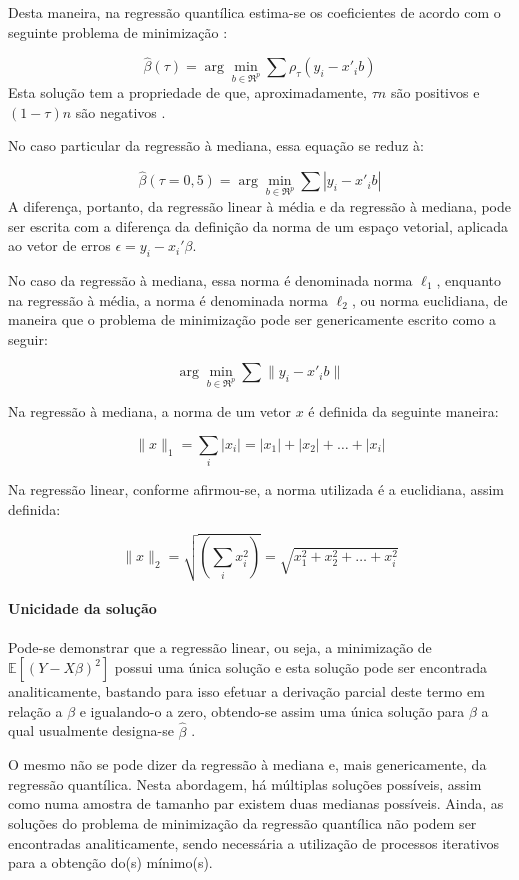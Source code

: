\documentclass[a4paper, 12pt]{article}
\let\oldparagraph\paragraph
\renewcommand{\paragraph}[1]{\oldparagraph{#1}\mbox{}}
\begin{document}
Desta maneira, na regressão quantílica estima-se os coeficientes de
acordo com o seguinte problema de minimização \autocite[2]{qr40}:

\[\hat \beta(\tau) = \arg \min_{b \in \mathfrak{R}^p}\sum \rho_\tau (y_i - x'_ib)\]
Esta solução tem a propriedade de que, aproximadamente, \(\tau n\) são
positivos e \((1-\tau)n\) são negativos \autocite[3]{qr40}.

No caso particular da regressão à mediana, essa equação se reduz à:

\[\hat \beta(\tau = 0,5) = \arg \min_{b \in \mathfrak{R}^p}\sum |y_i - x'_ib|\]
A diferença, portanto, da regressão linear à média e da regressão à
mediana, pode ser escrita com a diferença da definição da norma de um
espaço vetorial, aplicada ao vetor de erros
\(\epsilon = y_i - x_i'\beta\).

No caso da regressão à mediana, essa norma é denominada norma
\(\ell_1\), enquanto na regressão à média, a norma é denominada norma
\(\ell_2\), ou norma euclidiana, de maneira que o problema de
minimização pode ser genericamente escrito como a seguir:

\[\arg \min_{b \in \mathfrak{R}^p} \sum \lVert y_i - x'_ib \rVert\]

Na regressão à mediana, a norma de um vetor \(x\) é definida da seguinte
maneira:

\[\lVert x \rVert_1 = \sum_i |x_i| = |x_1| + |x_2| + \ldots + |x_i|\]

Na regressão linear, conforme afirmou-se, a norma utilizada é a
euclidiana, assim definida:

\[\lVert x \rVert_2 = \sqrt{\left(\sum_i x_i^2\right)} = \sqrt{x_1^2 + x_2^2 + \ldots + x_i^2}\]

\hypertarget{unicidade-da-solucao}{%
\paragraph{Unicidade da solução}\label{unicidade-da-solucao}}

Pode-se demonstrar que a regressão linear, ou seja, a minimização de
\(\mathbb{E}[(Y - X\beta)^2]\) possui uma única solução e esta solução
pode ser encontrada analiticamente, bastando para isso efetuar a
derivação parcial deste termo em relação a \(\beta\) e igualando-o a
zero, obtendo-se assim uma única solução para \(\beta\) a qual
usualmente designa-se \(\hat \beta\) \autocite[ver][49-50]{matloff2017}.

O mesmo não se pode dizer da regressão à mediana e, mais genericamente,
da regressão quantílica. Nesta abordagem, há múltiplas soluções
possíveis, assim como numa amostra de tamanho par existem duas medianas
possíveis. Ainda, as soluções do problema de minimização da regressão
quantílica não podem ser encontradas analiticamente, sendo necessária a
utilização de processos iterativos para a obtenção do(s) mínimo(s).
\end{document}
